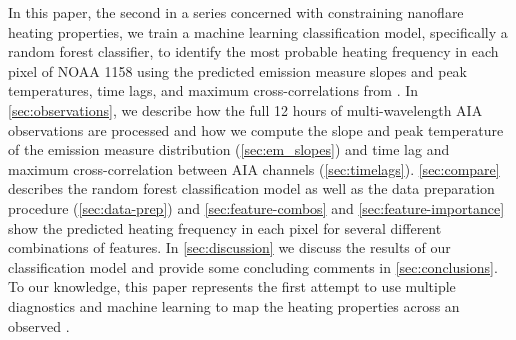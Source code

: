 In this paper, the second in a series concerned with constraining nanoflare heating properties, we train a machine learning classification model, specifically a random forest classifier, to identify the most probable heating frequency in each pixel of \AR{} NOAA 1158 using the predicted emission measure slopes and peak temperatures, time lags, and maximum cross-correlations from .
In \autoref{sec:observations}, we describe how the full 12 hours of multi-wavelength AIA observations are processed and how we compute the slope and peak temperature of the emission measure distribution (\autoref{sec:em_slopes}) and time lag and maximum cross-correlation between AIA channels (\autoref{sec:timelags}).
\autoref{sec:compare} describes the random forest classification model as well as the data preparation procedure (\autoref{sec:data-prep}) and \autoref{sec:feature-combos} and \autoref{sec:feature-importance} show the predicted heating frequency in each pixel for several different combinations of features.
In \autoref{sec:discussion} we discuss the results of our classification model and provide some concluding comments in \autoref{sec:conclusions}.
To our knowledge, this paper represents the first attempt to use multiple diagnostics and machine learning to map the heating properties across an observed \AR{}.